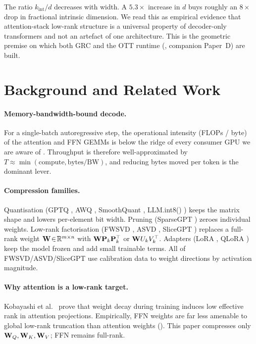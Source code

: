 \documentclass[11pt]{article}
\begin{document}
The ratio $k_{\mathrm{int}}/d$ decreases with width. A $5.3\times$ increase
in $d$ buys roughly an $8\times$ drop in fractional intrinsic dimension. We
read this as empirical evidence that attention-stack low-rank structure is
a universal property of decoder-only transformers and not an artefact of
one architecture. This is the geometric premise on which both GRC and the
OTT runtime (, companion Paper~D) are built.
\FloatBarrier
\section{Background and Related Work}
\label{sec:background}

\paragraph{Memory-bandwidth-bound decode.}
For a single-batch autoregressive step, the operational intensity (FLOPs /
byte) of the attention and FFN GEMMs is below the ridge of every consumer GPU
we are aware of \cite{yuan2024llmroofline,nvidia2022ada}.  Throughput is
therefore well-approximated by
$T \approx \min(\text{compute}, \text{bytes}/\text{BW})$, and reducing bytes
moved per token is the dominant lever.

\paragraph{Compression families.}
Quantisation (GPTQ \cite{frantar2022gptq}, AWQ \cite{lin2023awq},
SmoothQuant \cite{xiao2022smoothquant}, LLM.int8() \cite{dettmers2022llmint8})
keeps the matrix shape and lowers per-element bit width.  Pruning
(SparseGPT \cite{frantar2023sparsegpt}) zeroes individual weights.
Low-rank factorisation (FWSVD \cite{hsu2022fwsvd}, ASVD
\cite{yuan2023asvd}, SliceGPT \cite{ashkboos2024slicegpt}) replaces a
full-rank weight $\mathbf{W}\!\in\!\mathbb{R}^{m\times n}$ with $\mathbf{W}\mathbf{P}_k\mathbf{P}_k^\top$
or $\mathbf{W} U_kV_k^\top$.  Adapters (LoRA \cite{hu2021lora},
QLoRA \cite{dettmers2023qlora}) keep the model frozen and add small
trainable terms.  All of FWSVD/ASVD/SliceGPT use calibration data to
weight directions by activation magnitude.

\paragraph{Why attention is a low-rank target.}
Kobayashi et al.\ \cite{kobayashi2024lowrankattn} prove that weight decay
during training induces low effective rank in attention projections.
Empirically, FFN weights are far less amenable to global low-rank truncation
than attention weights ().  This paper compresses only
$\mathbf{W}_Q,\mathbf{W}_K,\mathbf{W}_V$; FFN remains full-rank.
\end{document}
